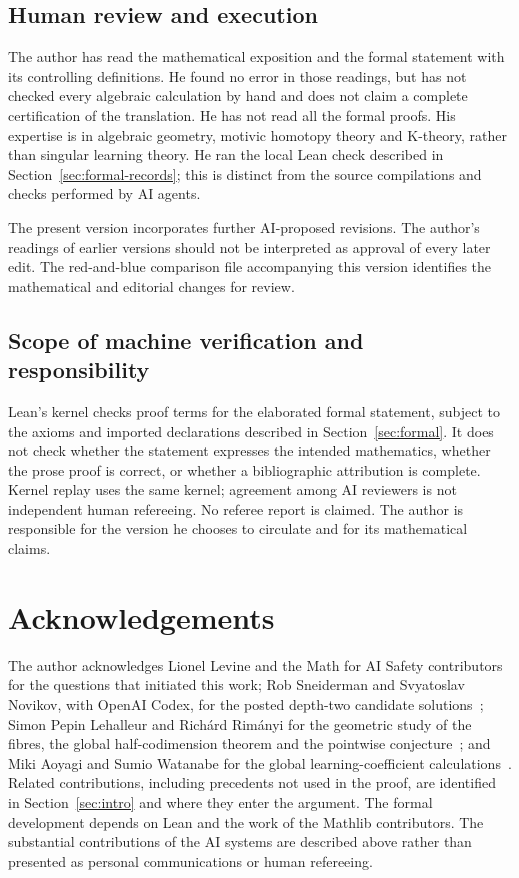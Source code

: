 \documentclass[11pt,a4paper]{article}
\theoremstyle{definition}
\theoremstyle{remark}
\numberwithin{equation}{section}
\begin{document}
\subsection*{Human review and execution}
The author has read the mathematical exposition and the formal statement with its controlling definitions. He found no error in those readings, but has not checked every algebraic calculation by hand and does not claim a complete certification of the translation. He has not read all the formal proofs. His expertise is in algebraic geometry, motivic homotopy theory and K-theory, rather than singular learning theory. He ran the local Lean check described in Section~\ref{sec:formal-records}; this is distinct from the source compilations and checks performed by AI agents.

The present version incorporates further AI-proposed revisions. The author's readings of earlier versions should not be interpreted as approval of every later edit. The red-and-blue comparison file accompanying this version identifies the mathematical and editorial changes for review.

\subsection*{Scope of machine verification and responsibility}
Lean's kernel checks proof terms for the elaborated formal statement, subject to the axioms and imported declarations described in Section~\ref{sec:formal}. It does not check whether the statement expresses the intended mathematics, whether the prose proof is correct, or whether a bibliographic attribution is complete. Kernel replay uses the same kernel; agreement among AI reviewers is not independent human refereeing. No referee report is claimed. The author is responsible for the version he chooses to circulate and for its mathematical claims.

\section*{Acknowledgements}
The author acknowledges Lionel Levine and the Math for AI Safety contributors for the questions that initiated this work; Rob Sneiderman and Svyatoslav Novikov, with OpenAI Codex, for the posted depth-two candidate solutions~\cite{mais-issue-3,mais-issue-12}; Simon Pepin Lehalleur and Richárd Rimányi for the geometric study of the fibres, the global half-codimension theorem and the pointwise conjecture~\cite{lehalleur-rimanyi}; and Miki Aoyagi and Sumio Watanabe for the global learning-coefficient calculations~\cite{aoyagi-watanabe,aoyagi-2024}. Related contributions, including precedents not used in the proof, are identified in Section~\ref{sec:intro} and where they enter the argument. The formal development depends on Lean and the work of the Mathlib contributors. The substantial contributions of the AI systems are described above rather than presented as personal communications or human refereeing.
\appendix
\end{document}
